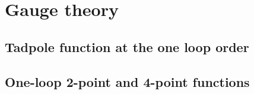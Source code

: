 \documentclass[10pt]{book}
\theoremstyle{break}
\begin{document}
\section{Gauge theory}

\subsection{Tadpole function at the one loop order}

\subsection{One-loop 2-point and 4-point functions}
\end{document}
